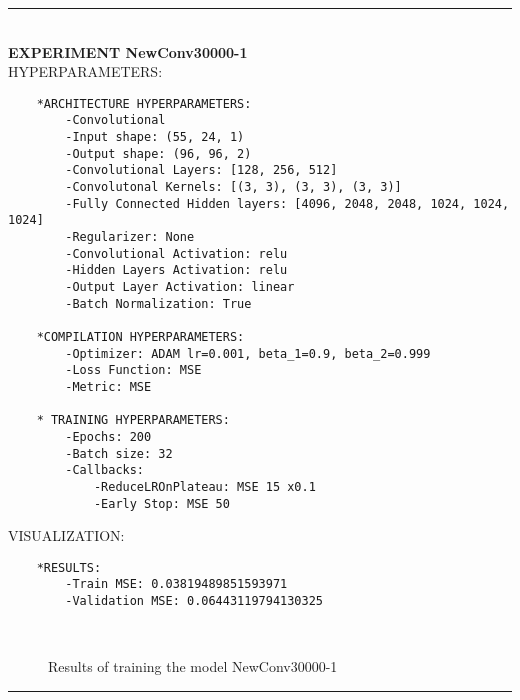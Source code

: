 \rule{0.5\textwidth}{0.5pt}\\

	{\large \textbf{EXPERIMENT NewConv30000-1}}\\
	
	{\normalsize HYPERPARAMETERS:}
	\begin{lstlisting}	
	*ARCHITECTURE HYPERPARAMETERS:
		-Convolutional
		-Input shape: (55, 24, 1)
		-Output shape: (96, 96, 2)
		-Convolutional Layers: [128, 256, 512]
		-Convolutonal Kernels: [(3, 3), (3, 3), (3, 3)]
		-Fully Connected Hidden layers: [4096, 2048, 2048, 1024, 1024, 1024]
		-Regularizer: None
		-Convolutional Activation: relu
		-Hidden Layers Activation: relu
		-Output Layer Activation: linear
		-Batch Normalization: True
	
	*COMPILATION HYPERPARAMETERS:
		-Optimizer: ADAM lr=0.001, beta_1=0.9, beta_2=0.999
		-Loss Function: MSE
		-Metric: MSE
	
	* TRAINING HYPERPARAMETERS:
		-Epochs: 200
		-Batch size: 32
		-Callbacks:
			-ReduceLROnPlateau: MSE 15 x0.1
			-Early Stop: MSE 50
	\end{lstlisting}
	
	{\normalsize VISUALIZATION:}
	\begin{lstlisting}
	*RESULTS:
        -Train MSE: 0.03819489851593971
        -Validation MSE: 0.06443119794130325
	\end{lstlisting}
	
	\begin{figure*}[ht!]
		\hspace{\fill}
		\hspace{\fill}	
		\\
		\caption{Results of training the model NewConv30000-1}
	\end{figure*}
	
\FloatBarrier	
\rule{0.5\textwidth}{0.5pt}\\